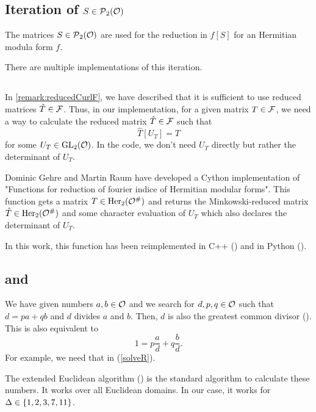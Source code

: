 \subsection{Iteration of $S \in \operatorname{\mathcal{P}}_2(\mathcal{O})$}

The matrices $S \in \operatorname{\mathcal{P}}_2(\mathcal{O})$ are used for the reduction in $f[S]$ for an Hermitian modula form $f$.

There are multiple implementations of this iteration.

\subsection{}
\label{impl:reduceGL}
In \cref{remark:reducedCurlF}, we have described that it is sufficient to use reduced matrices $\hat{T} \in \mathcal{F}$. Thus, in our implementation, for a given matrix $T \in \mathcal{F}$, we need a way to calculate the reduced matrix $\hat{T} \in \mathcal{F}$ such that
\[ \hat{T}[U_T] = T \]
for some $U_T \in \operatorname{GL}_2(\mathcal{O})$. In the code, we don't need $U_T$ directly but rather the determinant of $U_T$.

Dominic Gehre and Martin Raum have developed a Cython implementation \cite{Raum09reduceGL} of "Functions for reduction of fourier indice of Hermitian modular forms". This function  gets a matrix $T \in \operatorname{Her}_2(\mathcal{O}^\#)$ and returns the Minkowski-reduced matrix $\hat{T} \in \operatorname{Her}_2(\mathcal{O}^\#)$ and some character evaluation of $U_T$ which also declares the determinant of $U_T$.

In this work, this function  has been reimplemented in C++ () and in Python ().


\subsection{ and }

We have given numbers $a,b \in \mathcal{O}$ and we search for $d,p,q \in \mathcal{O}$ such that $d = pa + qb$ and $d$ divides $a$ and $b$. Then, $d$ is also the greatest common divisor (). This is also equivalent to
\[ 1 = p \frac{a}{d} + q \frac{b}{d} . \]
%
For example, we need that in  (\cref{solveR}).

The extended Euclidean algorithm () is the standard algorithm to calculate these numbers. It works over all Euclidean domains. In our case, it works for $\Delta \in \Set{1, 2, 3, 7, 11}$.

